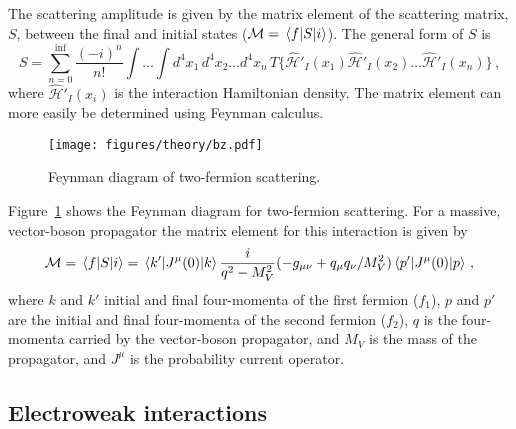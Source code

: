   The scattering amplitude is given by the matrix element of the scattering
  matrix, $S$, between the final and initial states ($\mathcal{M} =
  \mel{f}{S}{i}$).  The general form of $S$ is
  \begin{equation}
    S = \sum_{n=0}^{\inf} \frac{(-i)^n}{n!}\int\dots\int d^4x_1 \, d^4x_2 \dots d^4x_n\,
      T\{\hat{\mathcal{H}}'_I(x_1)\hat{\mathcal{H}}'_I(x_2)\dots\hat{\mathcal{H}}'_I(x_n)\} \,,
  \end{equation}
  where $\hat{\mathcal{H}}'_I(x_i)$ is the interaction Hamiltonian density. The
  matrix element can more easily be determined using Feynman calculus.
  \begin{figure}[ht]
    \centering
    \texttt{[image: figures/theory/bz.pdf]}
    \caption{Feynman diagram of two-fermion scattering.}
    \label{fig:feynmantwofermion}
  \end{figure}
  Figure~\ref{fig:feynmantwofermion} shows the Feynman diagram for two-fermion
  scattering. For a massive, vector-boson propagator the matrix element for
  this interaction is given by
  \begin{equation}\label{eq:genmatel}
    \mathcal{M} = \mel{f}{S}{i} = \mel{k'}{J^{\mu}(0)}{k} \frac{i}{q^2 - M_V^2}(-g_{\mu\nu} 
            + q_{\mu}q_{\nu}/M_V^2) \mel{p'}{J^{\mu}(0)}{p} \,,
  \end{equation}
  where $k$ and $k'$ initial and final four-momenta of the first fermion
  ($f_1$), $p$ and $p'$ are the initial and final four-momenta of the second
  fermion ($f_2$), $q$ is the four-momenta carried by the vector-boson
  propagator, and $M_V$ is the mass of the propagator, and $J^{\mu}$ is the
  probability current operator.


\subsection{Electroweak interactions}

